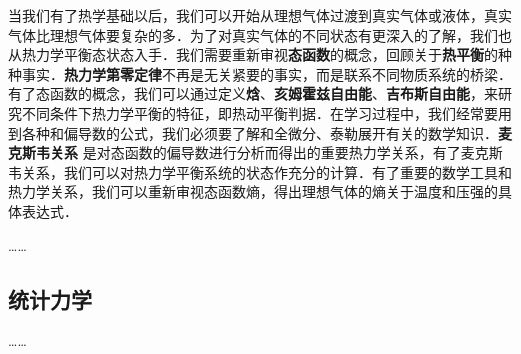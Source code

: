 当我们有了热学基础以后，我们可以开始从理想气体过渡到真实气体或液体，真实气体比理想气体要复杂的多．为了对真实气体的不同状态有更深入的了解，我们也从热力学平衡态状态入手．我们需要重新审视\textbf{态函数}的概念，回顾关于\textbf{热平衡}的种种事实．\textbf{热力学第零定律}不再是无关紧要的事实，而是联系不同物质系统的桥梁．有了态函数的概念，我们可以通过定义\textbf{焓}、\textbf{亥姆霍兹自由能}、\textbf{吉布斯自由能}，来研究不同条件下热力学平衡的特征，即热动平衡判据．在学习过程中，我们经常要用到各种和偏导数的公式，我们必须要了解和全微分、泰勒展开有关的数学知识．\textbf{麦克斯韦关系} 是对态函数的偏导数进行分析而得出的重要热力学关系，有了麦克斯韦关系，我们可以对热力学平衡系统的状态作充分的计算．有了重要的数学工具和热力学关系，我们可以重新审视态函数熵，得出理想气体的熵关于温度和压强的具体表达式．

……


\subsection{统计力学}
……
